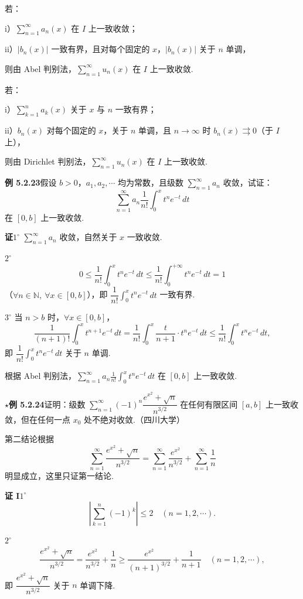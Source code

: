 \documentclass[UTF8,12pt,a4paper,fontset=fandol]{ctexart}
\begin{document}
若：

i）$\displaystyle\sum_{n=1}^{\infty}a_n(x)$ 在 $I$ 上一致收敛；

ii）$|b_n(x)|$ 一致有界，且对每个固定的 $x$，$|b_n(x)|$ 关于 $n$ 单调，

则由 Abel 判别法，$\displaystyle\sum_{n=1}^{\infty}u_n(x)$ 在 $I$ 上一致收敛.

若：

i）$\displaystyle\sum_{k=1}^{n}a_k(x)$ 关于 $x$ 与 $n$ 一致有界；

ii）$b_n(x)$ 对每个固定的 $x$，关于 $n$ 单调，且 $n\to\infty$ 时 $b_n(x)\rightrightarrows0$（于 $I$ 上），

则由 Dirichlet 判别法，$\displaystyle\sum_{n=1}^{\infty}u_n(x)$ 在 $I$ 上一致收敛.

\noindent\textbf{例 5.2.23}\quad 假设 $b>0$，$a_1,a_2,\cdots$ 均为常数，且级数
$\displaystyle\sum_{n=1}^{\infty}a_n$ 收敛，试证：
\[
  \sum_{n=1}^{\infty}a_n\frac1{n!}\int_0^x t^ne^{-t}\,dt
\]
在 $[0,b]$ 上一致收敛.

\noindent\textbf{证}\quad $1^\circ$ $\displaystyle\sum_{n=1}^{\infty}a_n$ 收敛，自然关于 $x$ 一致收敛.

$2^\circ$
\[
  0\le\frac1{n!}\int_0^x t^ne^{-t}\,dt
  \le\frac1{n!}\int_0^{+\infty}t^ne^{-t}\,dt=1
\]
（$\forall n\in\mathbb N,\ \forall x\in[0,b]$），即
$\dfrac1{n!}\displaystyle\int_0^x t^ne^{-t}\,dt$ 一致有界.

$3^\circ$ 当 $n>b$ 时，$\forall x\in[0,b]$，
\[
  \frac1{(n+1)!}\int_0^x t^{n+1}e^{-t}\,dt
  =\frac1{n!}\int_0^x\frac{t}{n+1}\cdot t^ne^{-t}\,dt
  \le\frac1{n!}\int_0^x t^ne^{-t}\,dt,
\]
即 $\dfrac1{n!}\displaystyle\int_0^x t^ne^{-t}\,dt$ 关于 $n$ 单调.

根据 Abel 判别法，$\displaystyle\sum_{n=1}^{\infty}a_n\frac1{n!}\int_0^x t^ne^{-t}\,dt$
在 $[0,b]$ 上一致收敛.

\noindent\textbf{$\star$例 5.2.24}\quad 证明：级数
$\displaystyle\sum_{n=1}^{\infty}(-1)^n\dfrac{e^{x^2}+\sqrt n}{n^{3/2}}$
在任何有限区间 $[a,b]$ 上一致收敛，但在任何一点 $x_0$ 处不绝对收敛.（四川大学）

第二结论根据
\[
  \sum_{n=1}^{\infty}\frac{e^{x^2}+\sqrt n}{n^{3/2}}
  =\sum_{n=1}^{\infty}\frac{e^{x^2}}{n^{3/2}}+\sum_{n=1}^{\infty}\frac1n
\]
明显成立，这里只证第一结论.

\noindent\textbf{证 I}\quad $1^\circ$
\[
  \left|\sum_{k=1}^{n}(-1)^k\right|\le2\quad(n=1,2,\cdots).
\]

$2^\circ$
\[
  \frac{e^{x^2}+\sqrt n}{n^{3/2}}
  =\frac{e^{x^2}}{n^{3/2}}+\frac1n
  \ge\frac{e^{x^2}}{(n+1)^{3/2}}+\frac1{n+1}\quad(n=1,2,\cdots),
\]
即 $\dfrac{e^{x^2}+\sqrt n}{n^{3/2}}$ 关于 $n$ 单调下降.
\end{document}

